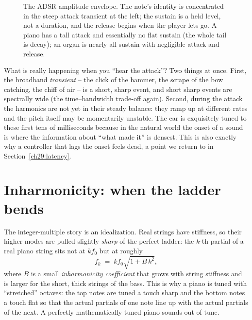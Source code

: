 \begin{figure}[H]
\centering
{}
\caption{The ADSR amplitude envelope. The note's identity is concentrated in the steep attack
transient at the left; the sustain is a held level, not a duration, and the release begins when the
player lets go. A piano has a tall attack and essentially no flat sustain (the whole tail is decay);
an organ is nearly all sustain with negligible attack and release.}
\label{ch29:fig-adsr}
\end{figure}

\begin{happeningbox}
What is really happening when you ``hear the attack''? Two things at once. First, the broadband
\emph{transient} -- the click of the hammer, the scrape of the bow catching, the chiff of air -- is a
short, sharp event, and short sharp events are spectrally wide (the time--bandwidth trade-off again).
Second, during the attack the harmonics are not yet in their steady balance: they ramp up at
different rates and the pitch itself may be momentarily unstable. The ear is exquisitely tuned to
these first tens of milliseconds because in the natural world the onset of a sound is where the
information about ``what made it'' is densest. This is also exactly why a controller that lags the
onset feels dead, a point we return to in Section~\ref{ch29:latency}.
\end{happeningbox}

\section{Inharmonicity: when the ladder bends}
\label{ch29:inharmonicity}

The integer-multiple story is an idealization. Real strings have stiffness, so their higher modes are
pulled slightly \emph{sharp} of the perfect ladder: the $k$-th partial of a real piano string sits
not at $k f_0$ but at roughly
\[
  f_k \;=\; k f_0 \sqrt{1 + B\,k^2},
\]
where $B$ is a small \emph{inharmonicity coefficient} that grows with string stiffness and is larger
for the short, thick strings of the bass. This is why a piano is tuned with ``stretched'' octaves:
the top notes are tuned a touch sharp and the bottom notes a touch flat so that the actual partials
of one note line up with the actual partials of the next. A perfectly mathematically tuned piano
sounds out of tune.

